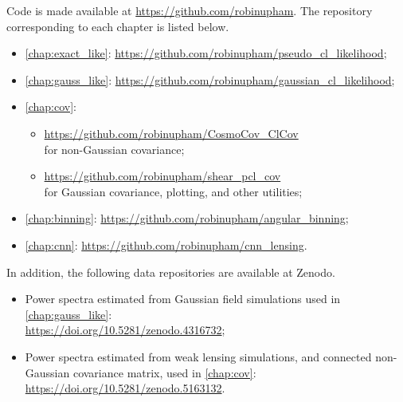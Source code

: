 Code is made available at \url{https://github.com/robinupham}. The repository corresponding to each chapter is listed below.

\begin{itemize}
\item \autoref{chap:exact_like}: \url{https://github.com/robinupham/pseudo_cl_likelihood};
\item \autoref{chap:gauss_like}: \url{https://github.com/robinupham/gaussian_cl_likelihood};
\item \autoref{chap:cov}:
\begin{itemize}
\item \url{https://github.com/robinupham/CosmoCov_ClCov} \\ for non-Gaussian covariance;
\item \url{https://github.com/robinupham/shear_pcl_cov} \\ for Gaussian covariance, plotting, and other utilities;
\end{itemize}
\item \autoref{chap:binning}: \url{https://github.com/robinupham/angular_binning};
\item \autoref{chap:cnn}: \url{https://github.com/robinupham/cnn_lensing}.
\end{itemize}

In addition, the following data repositories are available at Zenodo.

\begin{itemize}
\item Power spectra estimated from Gaussian field simulations used in \autoref{chap:gauss_like}: \\ \url{https://doi.org/10.5281/zenodo.4316732};
\item Power spectra estimated from \citet{Takahashi2017} weak lensing simulations, and connected non-Gaussian covariance matrix, used in \autoref{chap:cov}: \\ \url{https://doi.org/10.5281/zenodo.5163132}.
\end{itemize}



\pagestyle{headings} %


% 
